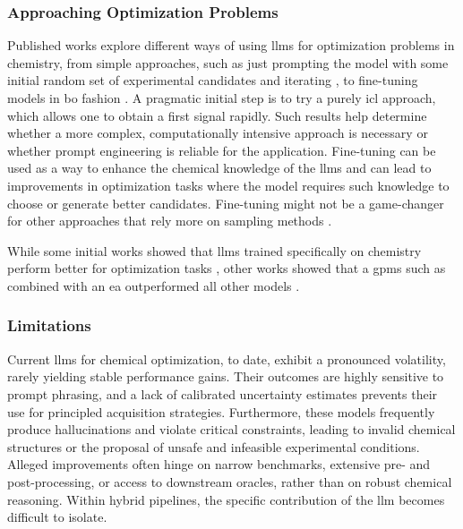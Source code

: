 \subsubsection{Approaching Optimization Problems}

Published works explore different ways of using \glspl{llm} for optimization problems in chemistry, from simple approaches, such as just prompting the model with some initial random set of experimental candidates and iterating \autocite{ramos2023bayesian}, to fine-tuning models in \gls{bo} fashion \autocite{rankovic2025gollum0}. 
A pragmatic initial step is to try a purely \gls{icl} approach, which allows one to obtain a first signal rapidly. 
Such results help determine whether a more complex, computationally intensive approach is necessary or whether prompt engineering is reliable for the application. 
Fine-tuning can be used as a way to enhance the chemical knowledge of the \glspl{llm} and can lead to improvements in optimization tasks where the model requires such knowledge to choose or generate better candidates. 
Fine-tuning might not be a game-changer for other approaches that rely more on sampling methods \autocite{wang2025llm0augmented}.

While some initial works showed that \glspl{llm} trained specifically on chemistry perform better for optimization tasks \autocite{kristiadi2024sober}, other works showed that a \glspl{gpm} such as  combined with an \gls{ea} outperformed all other models \autocite{wang2024efficient, macknight2025pre0trained}.


\subsubsection{Limitations}

Current \glspl{llm} for chemical optimization, to date, exhibit a pronounced volatility, rarely yielding stable performance gains. 
Their outcomes are highly sensitive to prompt phrasing, and a lack of calibrated uncertainty estimates prevents their use for principled acquisition strategies. \autocite{liu2024large}
Furthermore, these models frequently produce hallucinations and violate critical constraints, leading to invalid chemical structures or the proposal of unsafe and infeasible experimental conditions. 
Alleged improvements often hinge on narrow benchmarks, extensive pre- and post-processing, or access to downstream oracles, rather than on robust chemical reasoning. 
Within hybrid pipelines, the specific contribution of the \gls{llm} becomes difficult to isolate.

